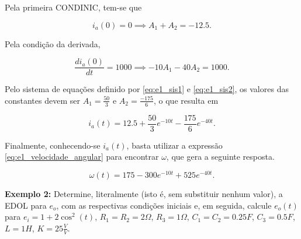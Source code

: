 \documentclass{article}
\numberwithin{equation}{section}
\let\dfr\dfrac
\begin{document}
\noindent Pela primeira CONDINIC, tem-se que

\begin{equation}
    i_a(0) = 0 \implies A_1 + A_2 = -12.5. \label{eq:e1_sis1}
\end{equation}

\noindent Pela condição da derivada,

\begin{equation}
    \dfr{di_a(0)}{dt} = 1000 \implies -10A_1 - 40A_2 = 1000 \label{eq:e1_sis2}.
\end{equation}

Pelo sistema de equações definido por \eqref{eq:e1_sis1} e \eqref{eq:e1_sis2}, os valores das constantes devem ser $A_1 = \frac{50}{3}$ e $A_2 = \frac{-175}{6}$, o que resulta em

\begin{equation}
    i_a(t) = 12.5 + \dfr{50}{3}e^{-10t} - \dfr{175}{6}e^{-40t}. \label{eq:e1_ia}
\end{equation}

\noindent Finalmente, conhecendo-se $i_a(t)$, basta utilizar a expressão \eqref{eq:e1_velocidade_angular} para encontrar $\omega$, que gera a seguinte resposta.

\begin{equation}
    \omega(t) = 175 - 300e^{-10t} + 525e^{-40t}.
\end{equation}

\noindent\textbf{Exemplo 2: }Determine, literalmente (isto é, sem substituir nenhum valor), a EDOL para $e_o$, com as respectivas condições iniciais e, em seguida, calcule $e_o(t)$ para $e_i= 1 + 2\cos^2(t)$, $R_1 = R_2 = 2\Omega$, $R_3=1\Omega$, $C_1 = C_2 = 0.25F$, $C_3 = 0.5F$, $L=1H$, $K = 25 \frac{V}{V}$.

\begin{center}
\end{center}
\end{document}
